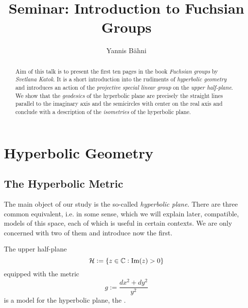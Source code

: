 

\title{Seminar: Introduction to Fuchsian Groups}
\author{Yannis B\"{a}hni}
\address[Yannis B\"{a}hni]{University of Zurich, R\"{a}mistrasse 71, 8006 Zurich}



\begin{abstract}
	Aim of this talk is to present the first ten pages in the book \emph{Fuchsian groups} by \emph{Svetlana Katok}. It is a short introduction into the rudiments of \emph{hyperbolic geometry} and introduces an action of the \emph{projective special linear group} on the \emph{upper half-plane}. We show that the \emph{geodesics} of the hyperbolic plane are precisely the straight lines parallel to the imaginary axis and the semicircles with center on the real axis and conclude with a description of the \emph{isometries} of the hyperbolic plane.
\end{abstract}

\maketitle

\tableofcontents

\section{Hyperbolic Geometry}
\subsection{The Hyperbolic Metric}
The main object of our study is the so-called \emph{hyperbolic plane}. There are three common equivalent, i.e. in some sense, which we will explain later, compatible, models of this space, each of which is useful in certain contexts. We are only concerned with two of them and introduce now the first. 

\begin{definition}
	The upper half-plane
	\begin{equation}
		\Hcal := \cbr[0]{z \in \Cbb : \Im(z) > 0}
	\end{equation}
	\noindent equipped with the metric
	\begin{equation}
		g := \frac{dx^2 + dy^2}{y^2}
	\end{equation}
	\noindent is a model for the hyperbolic plane, the .
	\label{def:half_space_model}
\end{definition}


